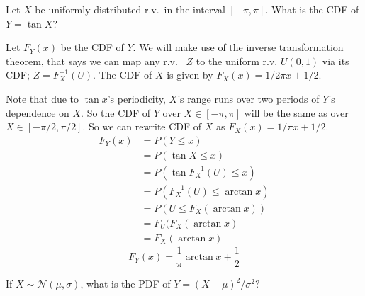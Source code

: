 \documentclass{article}
\begin{document}
    \nextproblem

    \begin{problem}
        Let $X$ be uniformly distributed r.v.~in the interval $[-\pi, \pi]$. What is the CDF of $Y = \tan{X}$?
    \end{problem}

    \begin{solution}
        Let $F_Y(x)$ be the CDF of $Y$. We will make use of the inverse transformation theorem, that says we can map any r.v.~ $Z$ to the uniform r.v. $U(0,1)$ via its CDF; $Z = F^{-1}_X(U)$.
        The CDF of $X$ is given by $F_X(x) = 1/2\pi x + 1/2$.

        Note that due to $\tan{x}$'s periodicity, $X$'s range runs over two periods of $Y$'s dependence on $X$. So the CDF of $Y$ over $X \in [-\pi, \pi]$ will be the same as over $X \in [-\pi/2, \pi/2]$. So we can rewrite CDF of $X$ as $F_X(x) = 1/\pi x + 1/2$.
        \begin{align*}
            F_Y(x) &= P(Y \leq x) \\
            &= P(\tan{X} \leq x) \\
            &= P(\tan{F^{-1}_X(U)} \leq x) \\
            &= P(F^{-1}_X(U) \leq \arctan{x}) \\
            &= P(U \leq F_X(\arctan{x})) \\
            &= F_U(F_X(\arctan{x}) \\
            &= F_X(\arctan{x})
        \end{align*}
        \begin{equation}
            F_Y(x) = \frac{1}{\pi} \arctan{x} + \frac{1} {2}
        \end{equation}
        
    \end{solution}


    \nextproblem
    \begin{problem}
        If $X \sim \mathcal{N}(\mu, \sigma)$, what is the PDF of $Y = (X - \mu)^2 / \sigma^2$?
    \end{problem}
\end{document}

